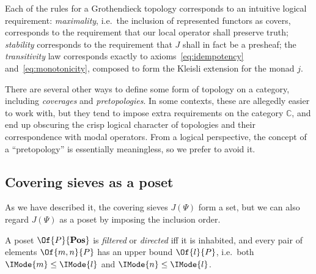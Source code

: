 \documentclass{article}
\newcommand\Posets{\mathbf{Pos}}
\begin{document}
Each of the rules for a Grothendieck topology corresponds to an
intuitive logical requirement: \emph{maximality}, i.e.\ the inclusion
of represented functors as covers, corresponds to the requirement that
our local operator shall preserve truth; \emph{stability} corresponds
to the requirement that $J$ shall in fact be a presheaf; the
\emph{transitivity} law corresponds exactly to
axioms~\ref{eq:idempotency} and~\ref{eq:monotonicity}, composed to
form the Kleisli extension for the monad $j$.

\begin{remark}
  There are several other ways to define some form of topology on a
  category, including \emph{coverages} and \emph{pretopologies}. In
  some contexts, these are allegedly easier to work with, but they
  tend to impose extra requirements on the category $\mathbb{C}$, and
  end up obscuring the crisp logical character of topologies and their
  correspondence with modal operators. From a logical perspective, the
  concept of a ``pretopology'' is essentially meaningless, so we
  prefer to avoid it.
\end{remark}

\subsection{Covering sieves as a poset}
\newcommand\IsLEQ[2]{\IMode{#1}\leq\IMode{#2}}

As we have described it, the covering sieves $J(\Psi)$ form a set, but
we can also regard $J(\Psi)$ as a poset by imposing the inclusion
order.

\begin{definition}
  A poset $\Of{P}{\Posets}$ is \emph{filtered} or \emph{directed} iff
  it is inhabited, and every pair of elements $\Of{m,n}{P}$ has an
  upper bound $\Of{l}{P}$, i.e.\ both $\IsLEQ{m}{l}$ and
  $\IsLEQ{n}{l}$.
\end{definition}
\end{document}
